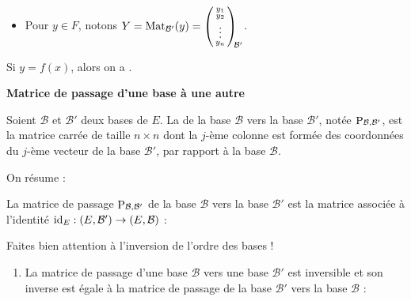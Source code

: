 \documentclass[10pt,class=article,crop=false]{standalone}
\begin{document}
\begin{multicols}{2}
\begin{itemize}
	\item Pour $y \in F$, notons $Y = \operatorname{Mat}_{\mathcal{B}'} (y) =
	\left(\begin{smallmatrix}y_1\cr y_2\cr \vdots \cr y_n\end{smallmatrix}\right)_{\!\!\mathcal{B}'}$.
\end{itemize}
\begin{proposition}
	\label{prop:matetapplin}
	Si $y = f(x)$, alors on a
	.
\end{proposition}



\textbf{Matrice de passage d'une base à une autre}


Soient $\mathcal{B}$ et $\mathcal{B}'$ deux bases de $E$. 
La  de la base $\mathcal{B}$ vers la base $\mathcal{B}'$, notée $\mathop{\mathrm{P}}\nolimits_{\mathcal{B},\mathcal{B'}}$, est la matrice carrée de taille $n \times n$ dont la $j$-ème colonne
est formée des coordonnées du $j$-ème vecteur de la base $\mathcal{B}'$,
par rapport à la base $\mathcal{B}$.

On résume :

\begin{proposition}
	La matrice de passage $\mathop{\mathrm{P}}\nolimits_{\mathcal{B},\mathcal{B}'}$
	de la base $\mathcal{B}$ vers la base $\mathcal{B}'$
	est la matrice associée à l'identité $\operatorname{id}_E :  (E, \mathcal{B}') \to (E,\mathcal{B})$ :
\end{proposition}
Faites bien attention à l'inversion de l'ordre des bases !



\begin{proposition}
	\label{prop:chgtbase}
	\sauteligne
	\begin{enumerate}
		\item La matrice de passage d'une base $\mathcal{B}$ vers une base $\mathcal{B}'$
		est inversible et son inverse est égale à la matrice de passage de la base $\mathcal{B}'$
		vers la base $\mathcal{B}$ :
		

\end{enumerate}
\end{proposition}
\end{multicols}
\end{document}
